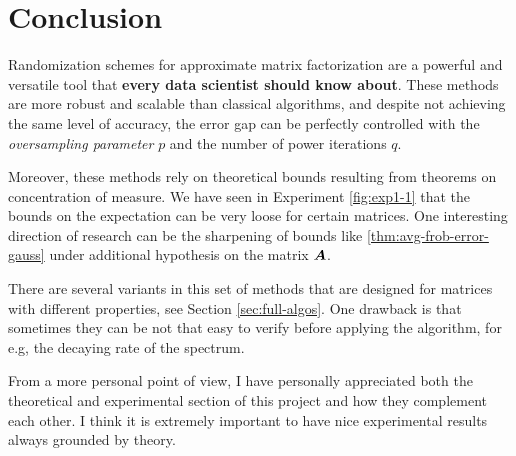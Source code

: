 \documentclass{amsart}
\theoremstyle{definition}
\theoremstyle{remark}
\numberwithin{equation}{section}
\begin{document}
\maketitle






\section{Conclusion}
Randomization schemes for approximate matrix factorization are a powerful and 
versatile tool that \textbf{every data scientist should know about}.
These methods are more robust and scalable than classical algorithms,
and despite not achieving the same level of accuracy, the error gap can be
perfectly controlled with the \textit{oversampling parameter} $p$ and
the number of power iterations $q$.

Moreover, these methods rely on theoretical bounds resulting from theorems
on concentration of measure. We have seen in Experiment \ref{fig:exp1-1}
that the bounds on the
expectation can be very loose for certain matrices. One interesting direction
of research can be the sharpening of bounds like \ref{thm:avg-frob-error-gauss}
under additional hypothesis on the matrix $\bm{A}$.


There are several variants in this set of methods that
are designed for matrices with different properties, see Section \ref{sec:full-algos}.
One drawback is that sometimes they can be not that easy to verify before
applying the algorithm, for e.g, the decaying
rate of the spectrum.

From a more personal point of view, I have personally appreciated both the 
theoretical and experimental section of this project and how they complement each other.
I think it is extremely important to have nice experimental results
always grounded by theory.

\printbibliography[heading=bibintoc]
% 

% 
\end{document}
